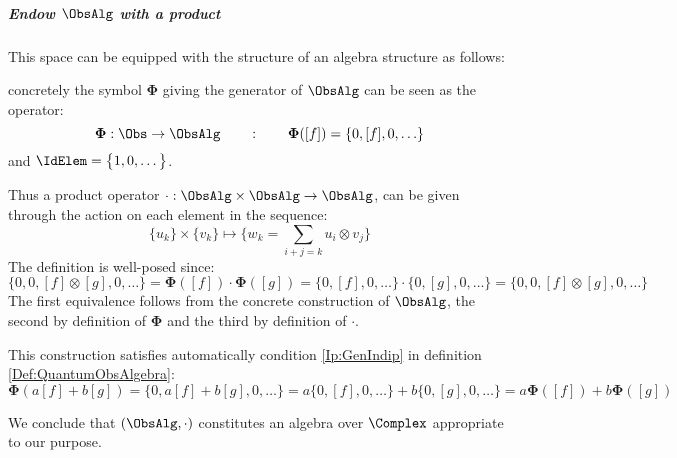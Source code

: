 \documentclass[Main]{subfiles}
\begin{document}
			\subparagraph{Endow $\ObsAlg$ with a product }
				This space can be equipped with the structure of an algebra structure as follows:
				
				concretely the symbol $\mathbf{\Phi}$ giving the generator of $\ObsAlg$ can be seen as the operator:
						\begin{displaymath}
							\mathbf{\Phi}: \Obs \rightarrow \ObsAlg \qquad : \qquad \mathbf{\Phi}([f]) = \{ 0, [f], 0,\ldots\}
						\end{displaymath}
						and $\IdElem = \big\{ 1,0,\ldots \big\}$.
				
				Thus a product operator $ \cdot : \ObsAlg \times \ObsAlg \rightarrow \ObsAlg$, can be given through the action on each element in the sequence:
					\begin{displaymath}
						\{ u_k\} \times \{ v_k \} \mapsto \{ w_k = \sum_{i+j=k} u_i \otimes v_j \}
					\end{displaymath}
					The definition is well-posed since:
					\begin{displaymath}
						\big\{ 0,0, [f]\otimes [g],0, \ldots \big\} = \mathbf{\Phi}([f]) \cdot \mathbf{\Phi}([g]) =
						\{0,[f],0,\ldots\} \cdot \{ 0,[g],0,\ldots\} = \big\{0,0, [f]\otimes [g],0,\ldots\big\}
					\end{displaymath}
					The first equivalence follows from the concrete construction of $\ObsAlg$, the second by definition of $\mathbf{\Phi}$ and the third by definition of $\cdot$.
				
				This construction satisfies automatically condition \ref{Ip:GenIndip} in definition \ref{Def:QuantumObsAlgebra}:
						\begin{displaymath}
							\mathbf{\Phi}(a[f] + b[g]) = \big\{0, a[f] + b[g],0, \ldots \big\}= a\{0, [f],0,\ldots\} + b\{0, [g],0,\ldots \} = a \mathbf{\Phi}([f]) + b \mathbf{\Phi}([g])
						\end{displaymath}

				We conclude that  $(\ObsAlg, \cdot )$ constitutes an algebra over $\Complex$ appropriate to our purpose.
   				
\end{document}
